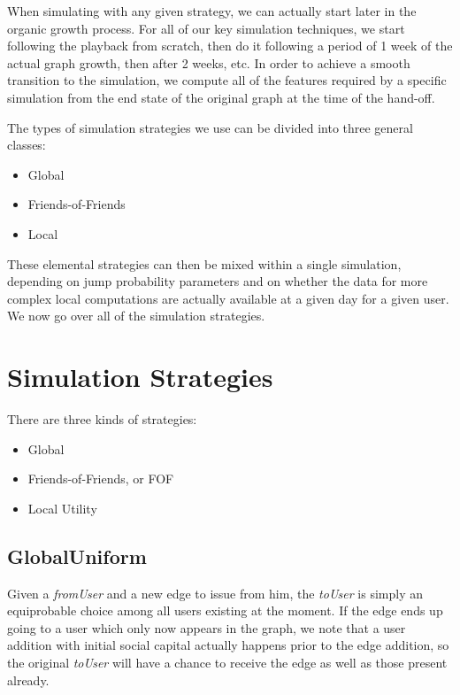 \documentclass[10pt,oneside]{memoir}
\begin{document}
When simulating with any given strategy, we can actually start later in the organic growth process.  For all of our key simulation techniques, we start following the playback from scratch, then do it following a period of 1 week of the actual graph growth, then after 2 weeks, etc.  In order to achieve a smooth transition to the simulation, we compute all of the features required by a specific simulation from the end state of the original graph at the time of the hand-off.


The types of simulation strategies we use can be divided into three general classes:


\begin{itemize}


\item Global

\item Friends-of-Friends

\item Local
\end{itemize}

These elemental strategies can then be mixed within a single simulation, depending on jump probability parameters and on whether the data for more complex local computations are actually available at a given day for a given user.  We now go over all of the simulation strategies.


\pagebreak \section{Simulation Strategies}
\label{simulationstrategies}

There are three kinds of strategies:


\begin{itemize}


\item Global

\item Friends-of-Friends, or FOF

\item Local Utility
\end{itemize}

\subsection{GlobalUniform}
\label{globaluniform}

Given a {\itshape fromUser} and a new edge to issue from him, the {\itshape toUser} is simply an equiprobable choice among all users existing at the moment.  If the edge ends up going to a user which only now appears in the graph, we note that a user addition with initial social capital actually happens prior to the edge addition, so the original {\itshape toUser} will have a chance to receive the edge as well as those present already.
\end{document}

